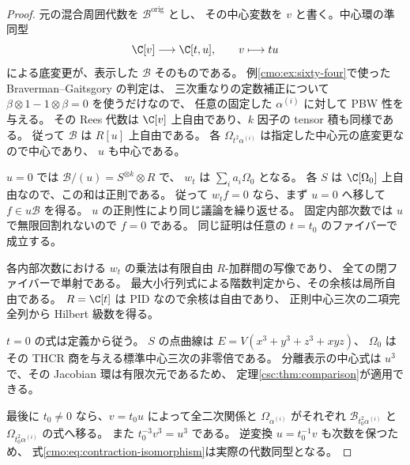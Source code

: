 \begin{proof}
元の混合周囲代数を $\mathcal B^{\mathrm{orig}}$ とし、
その中心変数を $v$ と書く。中心環の準同型
\[
 \C[v]\longrightarrow\C[t,u],\qquad v\longmapsto tu
\]
による底変更が、表示した $\mathscr B$ そのものである。
例\ref{cmo:ex:sixty-four}で使った Braverman--Gaitsgory の判定は、
三次重なりの定数補正について $\beta\otimes1-1\otimes\beta=0$ を使うだけなので、
任意の固定した $\alpha^{(i)}$ に対して PBW 性を与える。
その Rees 代数は $\C[v]$ 上自由であり、$k$ 因子の tensor 積も同様である。
従って $\mathscr B$ は $R[u]$ 上自由である。
各 $\Omega_{t^2\alpha^{(i)}}$ は指定した中心元の底変更なので中心であり、
$u$ も中心である。

$u=0$ では $\mathscr B/(u)=S^{\otimes k}\otimes R$ で、
$w_t$ は $\sum_i a_i\Omega_0$ となる。
各 $S$ は $\C[\Omega_0]$ 上自由なので、この和は正則である。
従って $w_t f=0$ なら、まず $u=0$ へ移して $f\in u\mathscr B$ を得る。
$u$ の正則性により同じ議論を繰り返せる。
固定内部次数では $u$ で無限回割れないので $f=0$ である。
同じ証明は任意の $t=t_0$ のファイバーで成立する。

各内部次数における $w_t$ の乗法は有限自由 $R$-加群間の写像であり、
全ての閉ファイバーで単射である。
最大小行列式による階数判定から、その余核は局所自由である。
$R=\C[t]$ は PID なので余核は自由であり、
正則中心三次の二項完全列から Hilbert 級数を得る。

$t=0$ の式は定義から従う。
$S$ の点曲線は $E=V(x^3+y^3+z^3+xyz)$、
$\Omega_0$ はその THCR 商を与える標準中心三次の非零倍である。
分離表示の中心式は $u^3$ で、その Jacobian 環は有限次元であるため、
定理\ref{csc:thm:comparison}が適用できる。

最後に $t_0\ne0$ なら、$v=t_0u$ によって全二次関係と
$\Omega_{\alpha^{(i)}}$ がそれぞれ
$\mathcal B_{t_0^2\alpha^{(i)}}$ と $\Omega_{t_0^2\alpha^{(i)}}$ の式へ移る。
また $t_0^{-3}v^3=u^3$ である。
逆変換 $u=t_0^{-1}v$ も次数を保つため、
式\eqref{cmo:eq:contraction-isomorphism}は実際の代数同型となる。
\end{proof}


